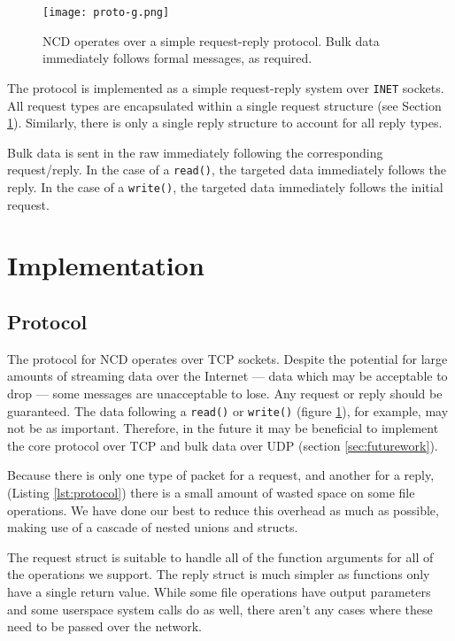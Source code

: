 \documentclass[11pt,twocolumn]{article}
\begin{document}
\begin{figure}[h]
  \centering
  \texttt{[image: proto-g.png]}
  \caption{NCD operates over a simple request-reply protocol. Bulk data
    immediately follows formal messages, as required.}
  \label{fig:protocol}
\end{figure}

The protocol is implemented as a simple request-reply system over
\texttt{INET} sockets. All request types are encapsulated within a
single request structure (see Section \ref{sec:implementation}).
Similarly, there is only a single reply structure to account for all
reply types.

Bulk data is sent in the raw immediately following the corresponding
request/reply. In the case of a \texttt{read()}, the targeted data
immediately follows the reply. In the case of a \texttt{write()}, the
targeted data immediately follows the initial request.

\section{Implementation}
\label{sec:implementation}

\subsection{Protocol}



The protocol for NCD operates over TCP sockets. Despite the potential
for large amounts of streaming data over the Internet --- data which may
be acceptable to drop --- some messages are unacceptable to lose. Any
request or reply should be guaranteed. The data following a
\texttt{read()} or \texttt{write()} (figure \ref{fig:protocol}), for
example, may not be as important. Therefore, in the future it may be
beneficial to implement the core protocol over TCP and bulk data over
UDP (section \ref{sec:futurework}).

Because there is only one type of packet for a request, and another for
a reply, (Listing \ref{lst:protocol}) there is a small amount of wasted
space on some file operations. We have done our best to reduce this
overhead as much as possible, making use of a cascade of nested unions
and structs.

The request struct is suitable to handle all of the function arguments
for all of the operations we support. The reply struct is much simpler
as functions only have a single return value. While some file operations
have output parameters and some userspace system calls do as well, there
aren't any cases where these need to be passed over the network.
\end{document}
